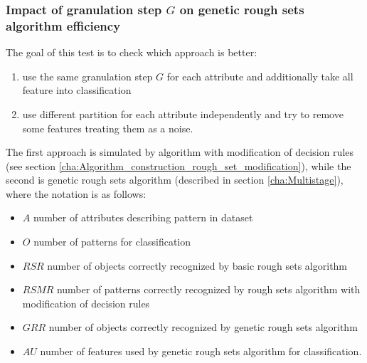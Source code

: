 \subsubsection{Impact of granulation step $G$ on genetic rough sets algorithm efficiency}
\label{cha:Simulation_reaearch_4}
The goal of this test is to check which approach is better:
\begin{enumerate}
    \item use the same granulation step $G$ for each attribute and additionally
        take all feature into classification
    \item use different partition for each attribute independently and try to
        remove some features treating them as a noise.
\end{enumerate}
The first approach is simulated by algorithm with modification of decision
rules (see section
\ref{cha:Algorithm_construction_rough_set_modification}), while the second
is genetic rough sets algorithm (described in section \ref{cha:Multistage}),
where the notation is as follows:
\begin{itemize}
    \item $A$ number of attributes describing pattern in dataset
    \item $O$ number of patterns for classification
    \item $RSR$ number of objects correctly recognized by basic rough sets
        algorithm
    \item $RSMR$ number of patterns correctly recognized by rough sets
        algorithm with modification of decision rules
    \item $GRR$ number of objects correctly recognized by genetic rough sets
        algorithm
    \item $AU$ number of features used by genetic rough sets algorithm for
        classification.
\end{itemize}

